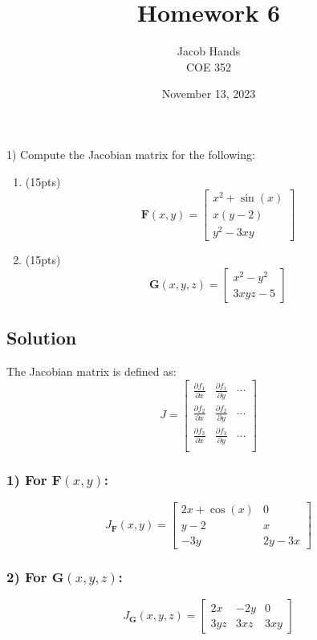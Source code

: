 \documentclass[11pt]{article}
\title{Homework 6}
\author{Jacob Hands \\ COE 352}
\date{November 13, 2023}
\begin{document}
\maketitle

1) Compute the Jacobian matrix for the following:
\begin{enumerate}
    \item (15pts)
    \[
    \bm{F}(x, y) =
    \begin{bmatrix}
        x^2 + \sin(x) \\
        x(y - 2) \\
        y^2 - 3xy
    \end{bmatrix}
    \]

    \item (15pts)
    \[
    \bm{G}(x, y, z) =
    \begin{bmatrix}
        x^2 - y^2 \\
        3xyz - 5
    \end{bmatrix}
    \]
\end{enumerate}

\subsection*{Solution}
The Jacobian matrix is defined as:
\[
J =
\begin{bmatrix}
    \frac{\partial f_1}{\partial x} & \frac{\partial f_1}{\partial y} & \cdots \\
    \frac{\partial f_2}{\partial x} & \frac{\partial f_2}{\partial y} & \cdots \\
    \frac{\partial f_3}{\partial x} & \frac{\partial f_3}{\partial y} & \cdots \\
\end{bmatrix}
\]

\subsubsection*{1) For \(\bm{F}(x, y)\):}
\[
J_{\bm{F}}(x, y) =
\begin{bmatrix}
    2x + \cos(x) & 0 \\
    y - 2 & x  \\
    -3y & 2y - 3x 
\end{bmatrix}
\]

\subsubsection*{2) For \(\bm{G}(x, y, z)\):}
\[
J_{\bm{G}}(x, y, z) =
\begin{bmatrix}
    2x & -2y & 0 \\
    3yz & 3xz & 3xy
\end{bmatrix}
\]
\end{document}
